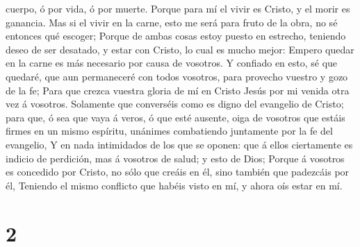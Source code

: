 cuerpo, ó por vida, ó por muerte.  Porque para mí el
vivir es Cristo, y el morir es ganancia.  Mas si el vivir
en la carne, esto me será para fruto de la obra, no sé entonces qué
escoger;  Porque de ambas cosas estoy puesto en estrecho,
teniendo deseo de ser desatado, y estar con Cristo, lo cual es mucho
mejor:  Empero quedar en la carne es más necesario por
causa de vosotros.  Y confiado en esto, sé que quedaré,
que aun permaneceré con todos vosotros, para provecho vuestro y gozo de
la fe;  Para que crezca vuestra gloria de mí en Cristo
Jesús por mi venida otra vez á vosotros.  Solamente que
converséis como es digno del evangelio de Cristo; para que, ó sea que
vaya á veros, ó que esté ausente, oiga de vosotros que estáis firmes en
un mismo espíritu, unánimes combatiendo juntamente por la fe del
evangelio,  Y en nada intimidados de los que se oponen:
que á ellos ciertamente es indicio de perdición, mas á vosotros de
salud; y esto de Dios;  Porque á vosotros es concedido
por Cristo, no sólo que creáis en él, sino también que padezcáis por él,
 Teniendo el mismo conflicto que habéis visto en mí, y
ahora oís estar en mí.

\hypertarget{section-1}{%
\section{2}\label{section-1}}

